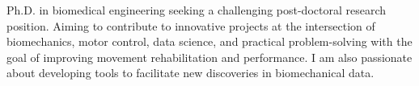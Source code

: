 \small{
Ph.D. in biomedical engineering seeking a challenging post-doctoral research position. Aiming to contribute to innovative projects at the intersection of biomechanics, motor control, data science, and practical problem-solving with the goal of improving movement rehabilitation and performance. I am also passionate about developing tools to facilitate new discoveries in biomechanical data.
}